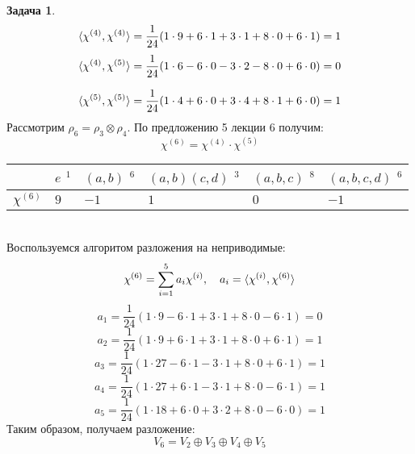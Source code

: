 \documentclass[12pt]{article}
\theoremstyle{definition}
\newtheorem{zad}{Задача}[section]
\begin{document}
\begin{zad}
\begin{equation}
    \braket{\chi^{(4)},\chi^{(4)}}=\frac{1}{24}(1\cdot9+6\cdot1+3\cdot 1+8\cdot 0+6\cdot1)=1
\end{equation}
\begin{equation}
    \braket{\chi^{(4)},\chi^{(5)}}=\frac{1}{24}(1\cdot6-6\cdot0-3\cdot2-8\cdot0+6\cdot0)=0
\end{equation}

\begin{equation}
    \braket{\chi^{(5)},\chi^{(5)}}=\frac{1}{24}(1\cdot4+6\cdot0+3\cdot4+8\cdot1+6\cdot0)=1
\end{equation}
Рассмотрим $\rho_6=\rho_3\otimes\rho_4$. По предложению 5 лекции 6 получим:
\begin{equation}
    \chi^{(6)}=\chi^{(4)}\cdot \chi^{(5)}
\end{equation}
\begin{table}[h!]
\centering
\begin{tabular}{|l|l|l|l|l|l|}
\hline
 & $e$ $^1$ & $(a,b)$ $^6$ & $(a,b)(c,d)$ $^3$ & $(a,b,c)$ $^8$ & $(a,b,c,d)$ $^6$ \\ \hline
$\chi^{(6)}$ & $9$ & $-1$ & $1$ & $0$ & $-1$ \\ \hline
\end{tabular}
\end{table}\\
Воспользуемся алгоритом разложения на неприводимые:
\begin{equation}
    \chi^{(6)}=\sum\limits_{i=1}^5 a_i\chi^{(i)},\quad a_i=\braket{\chi^{(i)},\chi^{(6)}}
\end{equation}
\begin{equation}
    a_1=\frac{1}{24}(1\cdot9-6\cdot1+3\cdot1+8\cdot0-6\cdot1)=0
\end{equation}
\begin{equation}
    a_2=\frac{1}{24}(1\cdot9+6\cdot1+3\cdot1+8\cdot0+6\cdot1)=1
\end{equation}
\begin{equation}
    a_3=\frac{1}{24}(1\cdot27-6\cdot1-3\cdot1+8\cdot0+6\cdot1)=1
\end{equation}
\begin{equation}
    a_4=\frac{1}{24}(1\cdot27+6\cdot1-3\cdot1+8\cdot0-6\cdot1)=1
\end{equation}
\begin{equation}
    a_5=\frac{1}{24}(1\cdot18+6\cdot0+3\cdot2+8\cdot0-6\cdot0)=1
\end{equation}
Таким образом, получаем разложение:
\begin{equation}
    \boxed{V_6=V_2\oplus V_3\oplus V_4\oplus V_5}
\end{equation}
\end{zad}
\end{document}
